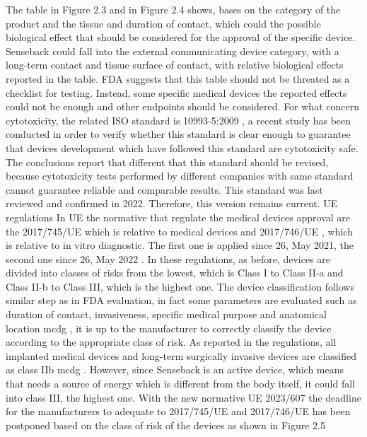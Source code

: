 \documentclass{Configuration_Files/PoliMi3i_thesis}
\begin{document}
The table in Figure 2.3 and in Figure 2.4 shows, bases on the category of the product and the tissue and duration of contact, which could the possible biological effect that should be considered for the approval of the specific device.
Senseback could fall into the external communicating device category, with a long-term contact and tissue surface of contact, with relative biological effects reported in the table.  
FDA suggests that this table should not be threated as a checklist for testing. Instead, some specific medical devices the reported effects could not be enough and other endpoints should be considered.
For what concern cytotoxicity, the related ISO standard is 10993-5:2009 \cite{14:00-17:00ISO1099352009a}, a recent study \cite{gruberToxicNotToxic2023} has been conducted in order to verify whether this standard is clear enough to guarantee that devices development which have followed this standard are cytotoxicity safe. The conclusions report that different that this standard should be revised, because cytotoxicity tests performed by different companies with same standard cannot guarantee reliable and comparable results. This standard was last reviewed and confirmed in 2022. Therefore, this version remains current. 
UE regulations
In UE the normative that regulate the medical devices approval are the 2017/745/UE \cite{RegolamentoUE20172017} which is relative to medical devices and 2017/746/UE \cite{RegolamentoUE20172017a}, which is relative to in vitro diagnostic. The first one is applied since 26, May 2021, the second one since 26, May 2022 \cite{MedicalDevicesEuropean}. 
In these regulations, as before, devices are divided into classes of risks from the lowest, which is Class I to Class II-a and Class II-b to Class III, which is the highest one. The device classification follows similar step as in FDA evaluation, in fact some parameters are evaluated such as duration of contact, invasiveness, specific medical purpose and anatomical location \cite{PublicHealthEuropean2024} mcdg , it is up to the manufacturer to correctly classify the device according to the appropriate class of risk.
As reported in the regulations, all implanted medical devices and long-term surgically invasive devices are classified as class IIb \cite{PublicHealthEuropean2024} mcdg . However, since Senseback is an active device, which means that needs a source of energy which is different from the body itself, it could fall into class III, the highest one.
With the new normative UE 2023/607 \cite{RegolamentoUE20232023} the deadline for the manufacturers to adequate to 2017/745/UE and 2017/746/UE has been postponed based on the class of risk of the devices as shown in Figure 2.5
\end{document}
